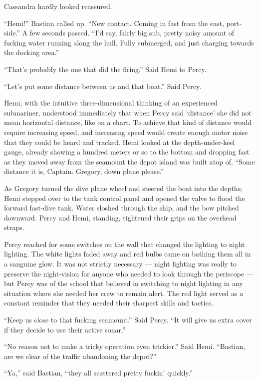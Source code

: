 \documentclass[
]{scrbook}
\begin{document}
Cassandra hardly looked reassured.

``Hemi!'' Bastian called up. ``New contact. Coming in fast from the
east, port-side.'' A few seconds passed. ``I'd say, fairly big sub,
pretty noisy amount of fucking water running along the hull. Fully
submerged, and just charging towards the docking area.''

``That's probably the one that did the firing.'' Said Hemi to Percy.

``Let's put some distance between us and that boat.'' Said Percy.

Hemi, with the intuitive three-dimensional thinking of an experienced
submariner, understood immediately that when Percy said `distance' she
did not mean horizontal distance, like on a chart. To achieve that kind
of distance would require increasing speed, and increasing speed would
create enough motor noise that they could be heard and tracked. Hemi
looked at the depth-under-keel gauge, already showing a hundred meters
or so to the bottom and dropping fast as they moved away from the
seamount the depot island was built atop of. ``Some distance it is,
Captain. Gregory, down plane please.''

As Gregory turned the dive plane wheel and steered the boat into the
depths, Hemi stepped over to the tank control panel and opened the valve
to flood the forward fast-dive tank. Water sloshed through the ship, and
the bow pitched downward. Percy and Hemi, standing, tightened their
grips on the overhead straps.

Percy reached for some switches on the wall that changed the lighting to
night lighting. The white lights faded away and red bulbs came on
bathing them all in a sanguine glow. It was not strictly necessary ---
night lighting was really to preserve the night-vision for anyone who
needed to look through the periscope --- but Percy was of the school
that believed in switching to night lighting in any situation where she
needed her crew to remain alert. The red light served as a constant
reminder that they needed their sharpest skills and tactics.

``Keep us close to that fucking seamount.'' Said Percy. ``It will give
us extra cover if they decide to use their active sonar.''

``No reason not to make a tricky operation even trickier.'' Said Hemi.
``Bastian, are we clear of the traffic abandoning the depot?''

``Ya,'' said Bastian, ``they all scattered pretty fuckin' quickly.''
\end{document}
